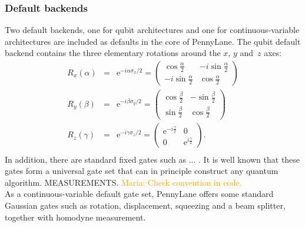 \documentclass[aps,pra,10pt,twocolumn,groupedaddress,nofootinbib]{revtex4-1}
\theoremstyle{plain}
\renewcommand{\a}{\hat{a}}
\newcommand{\adag}{\hat{a}^{\dagger}}
\newcommand{\e}{\mathrm{e}}
\newcommand{\maria}[1]{\textcolor{orange}{Maria: #1}}
\begin{document}
\subsubsection{Default backends}
 Two default backends, one for qubit architectures and one for continuous-variable architectures are included as defaults in the core of PennyLane. The qubit default backend contains the three  elementary rotations around the $x$, $y$ and~$z$ axes:
\begin{eqnarray*}
        R_x(\alpha) &=& \e^{-i\alpha \sigma_x/2} =
        \begin{pmatrix}
          \cos \frac{\alpha}{2} & -i \sin \frac{\alpha}{2}\\
          -i \sin \frac{\alpha}{2} & \cos \frac{\alpha}{2}
        \end{pmatrix}\\
        R_y(\beta) &=& \e^{-i\beta \sigma_y/2} =
        \begin{pmatrix}
          \cos \frac{\beta}{2} & -\sin \frac{\beta}{2}\\
          \sin \frac{\beta}{2} & \cos \frac{\beta}{2}
        \end{pmatrix}\\
        R_z(\gamma) &=& \e^{-i\gamma \sigma_z/2}=
        \begin{pmatrix}
          \e^{-i \frac{\gamma}{2}} & 0\\
          0 & \e^{i \frac{\gamma}{2}}
        \end{pmatrix}.\\
\end{eqnarray*}
In addition, there are standard fixed gates such as ... . It is well known \cite{barenco1995} that these gates form a universal gate set that can in principle construct any quantum algorithm. MEASUREMENTS.
\maria{Check convention in code.}\\

As a continuous-variable default gate set, PennyLane offers some standard Gaussian gates such as rotation, displacement, squeezing and a beam splitter, together with homodyne measurement.\\
\end{document}
